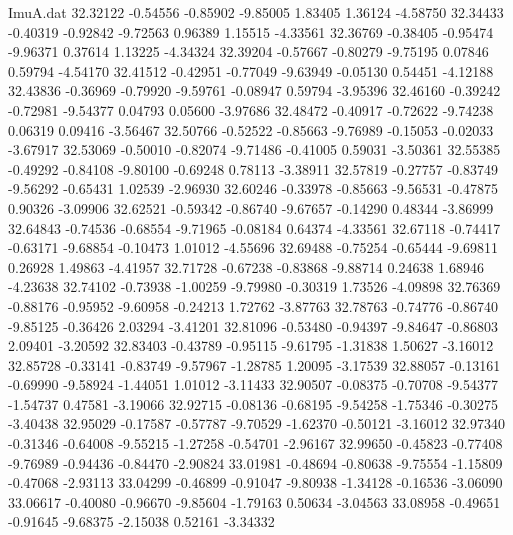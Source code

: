 \begin{filecontents}{ImuA.dat}
  32.32122   -0.54556   -0.85902   -9.85005    1.83405    1.36124   -4.58750
  32.34433   -0.40319   -0.92842   -9.72563    0.96389    1.15515   -4.33561
  32.36769   -0.38405   -0.95474   -9.96371    0.37614    1.13225   -4.34324
  32.39204   -0.57667   -0.80279   -9.75195    0.07846    0.59794   -4.54170
  32.41512   -0.42951   -0.77049   -9.63949   -0.05130    0.54451   -4.12188
  32.43836   -0.36969   -0.79920   -9.59761   -0.08947    0.59794   -3.95396
  32.46160   -0.39242   -0.72981   -9.54377    0.04793    0.05600   -3.97686
  32.48472   -0.40917   -0.72622   -9.74238    0.06319    0.09416   -3.56467
  32.50766   -0.52522   -0.85663   -9.76989   -0.15053   -0.02033   -3.67917
  32.53069   -0.50010   -0.82074   -9.71486   -0.41005    0.59031   -3.50361
  32.55385   -0.49292   -0.84108   -9.80100   -0.69248    0.78113   -3.38911
  32.57819   -0.27757   -0.83749   -9.56292   -0.65431    1.02539   -2.96930
  32.60246   -0.33978   -0.85663   -9.56531   -0.47875    0.90326   -3.09906
  32.62521   -0.59342   -0.86740   -9.67657   -0.14290    0.48344   -3.86999
  32.64843   -0.74536   -0.68554   -9.71965   -0.08184    0.64374   -4.33561
  32.67118   -0.74417   -0.63171   -9.68854   -0.10473    1.01012   -4.55696
  32.69488   -0.75254   -0.65444   -9.69811    0.26928    1.49863   -4.41957
  32.71728   -0.67238   -0.83868   -9.88714    0.24638    1.68946   -4.23638
  32.74102   -0.73938   -1.00259   -9.79980   -0.30319    1.73526   -4.09898
  32.76369   -0.88176   -0.95952   -9.60958   -0.24213    1.72762   -3.87763
  32.78763   -0.74776   -0.86740   -9.85125   -0.36426    2.03294   -3.41201
  32.81096   -0.53480   -0.94397   -9.84647   -0.86803    2.09401   -3.20592
  32.83403   -0.43789   -0.95115   -9.61795   -1.31838    1.50627   -3.16012
  32.85728   -0.33141   -0.83749   -9.57967   -1.28785    1.20095   -3.17539
  32.88057   -0.13161   -0.69990   -9.58924   -1.44051    1.01012   -3.11433
  32.90507   -0.08375   -0.70708   -9.54377   -1.54737    0.47581   -3.19066
  32.92715   -0.08136   -0.68195   -9.54258   -1.75346   -0.30275   -3.40438
  32.95029   -0.17587   -0.57787   -9.70529   -1.62370   -0.50121   -3.16012
  32.97340   -0.31346   -0.64008   -9.55215   -1.27258   -0.54701   -2.96167
  32.99650   -0.45823   -0.77408   -9.76989   -0.94436   -0.84470   -2.90824
  33.01981   -0.48694   -0.80638   -9.75554   -1.15809   -0.47068   -2.93113
  33.04299   -0.46899   -0.91047   -9.80938   -1.34128   -0.16536   -3.06090
  33.06617   -0.40080   -0.96670   -9.85604   -1.79163    0.50634   -3.04563
  33.08958   -0.49651   -0.91645   -9.68375   -2.15038    0.52161   -3.34332

\end{filecontents}
